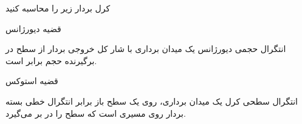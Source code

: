 
\begin{ELexample}{}

کرل بردار زیر را محاسبه کنید

\begin{ELsolution}



\end{ELsolution}

\end{ELexample}

\ELhold


\begin{ELunit}


\end{ELunit}

\begin{ELtheorem}{قضیه دیورژانس}

انتگرال حجمی دیورژانس یک میدان برداری با شار کل خروجی بردار از سطح در برگیرنده حجم برابر است.

\end{ELtheorem}

\begin{ELunit}


\end{ELunit}

\begin{ELtheorem}{قضیه استوکس}

انتگرال سطحی کرل یک میدان برداری، روی یک سطح باز برابر انتگرال خطی بسته بردار روی مسیری است که سطح را در بر می‌گیرد.

\end{ELtheorem}

